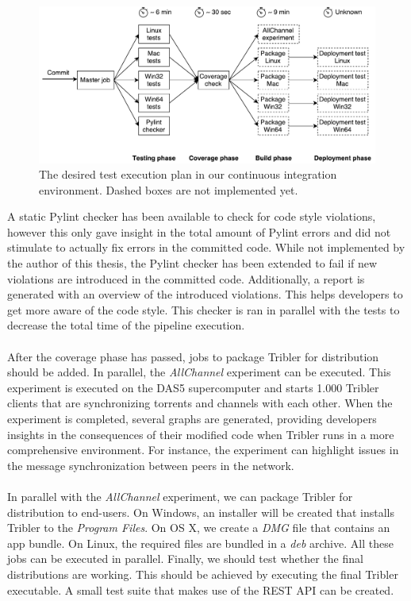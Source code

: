 \begin{figure}[h!]
	\centering
	\includegraphics[width=0.9\columnwidth]{images/improving_qa/jenkins_pipeline}
	\caption{The desired test execution plan in our continuous integration environment. Dashed boxes are not implemented yet.}
	\label{fig:jenkins-pipeline}
\end{figure}

A static Pylint checker has been available to check for code style violations, however this only gave insight in the total amount of Pylint errors and did not stimulate to actually fix errors in the committed code. While not implemented by the author of this thesis, the Pylint checker has been extended to fail if new violations are introduced in the committed code. Additionally, a report is generated with an overview of the introduced violations. This helps developers to get more aware of the code style. This checker is ran in parallel with the tests to decrease the total time of the pipeline execution.\\\\
After the coverage phase has passed, jobs to package Tribler for distribution should be added. In parallel, the \emph{AllChannel} experiment can be executed. This experiment is executed on the DAS5 supercomputer and starts 1.000 Tribler clients that are synchronizing torrents and channels with each other. When the experiment is completed, several graphs are generated, providing developers insights in the consequences of their modified code when Tribler runs in a more comprehensive environment. For instance, the experiment can highlight issues in the message synchronization between peers in the network.\\\\
In parallel with the \emph{AllChannel} experiment, we can package Tribler for distribution to end-users. On Windows, an installer will be created that installs Tribler to the \emph{Program Files}. On OS X, we create a \emph{DMG} file that contains an app bundle. On Linux, the required files are bundled in a \emph{deb} archive. All these jobs can be executed in parallel. Finally, we should test whether the final distributions are working. This should be achieved by executing the final Tribler executable. A small test suite that makes use of the REST API can be created.

